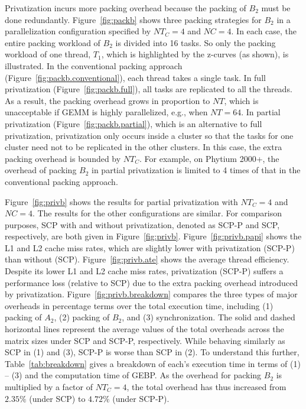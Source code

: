 Privatization incurs more packing overhead because
the packing of $B_2$ must be done redundantly.
Figure~\ref{fig:packb} shows three packing strategies for $B_2$
in a parallelization configuration specified by
$NT_C=4$ and $NC=4$.
In each case, the entire packing workload of $B_2$ is divided into 16 tasks.
So only the packing workload of one thread, $T_1$, 
which is highlighted by the z-curves (as shown), is illustrated.
In the conventional packing approach
(Figure~\ref{fig:packb.conventional}),
each thread takes a single task.
In full privatization
(Figure~\ref{fig:packb.full}),
all tasks are replicated to all
the threads.
As a result, the packing overhead grows in proportion to $NT$, which is unacceptable
if GEMM is highly parallelized, e.g., when $NT=64$.
In partial privatization 
(Figure~\ref{fig:packb.partial}), which is 
an alternative to full privatization,
privatization only occurs inside
a cluster so that the tasks for one cluster need not to be
replicated in the other clusters.
In this case, the extra packing overhead
is bounded by $NT_C$.
For example, on Phytium 2000+, the
overhead of packing $B_2$
in partial privatization is limited to 4 times
of that in the conventional packing approach.

Figure~\ref{fig:privb} shows the results for partial
privatization with $NT_C=4$ and $NC=4$.
The results for the other 
configurations are similar.
For comparison purposes,
SCP with and without privatization,
denoted as SCP-P and SCP, respectively,
are both given in Figure~\ref{fig:privb}.
Figure~\ref{fig:privb.papi} shows the L1 and L2
cache miss rates, which are 
slightly lower with privatization (SCP-P) than without
(SCP). Figure~\ref{fig:privb.ate} shows the average thread efficiency.
Despite its lower L1 and L2 cache miss rates,
privatization (SCP-P) suffers a performance loss
(relative to SCP) due to 
the extra packing overhead introduced by privatization.
Figure~\ref{fig:privb.breakdown} compares the
three types of major overheads in percentage terms 
over the total execution time, including
(1) packing of $A_2$, (2) packing of $B_2$,
and (3) synchronization.
The solid and dashed horizontal lines represent
the average values of the total overheads
across the matrix sizes
under SCP and SCP-P, respectively.
While behaving similarly as SCP
in (1) and (3), SCP-P is worse than SCP in (2).
To understand this further,
Table~\ref{tab:breakdown} gives a breakdown of each's
execution time in terms of (1) -- (3) and the
computation time of GEBP. As
the overhead for packing $B_2$
is multiplied by a factor of $NT_C=4$,
the total overhead has thus increased
from $2.35\%$ (under SCP) to $4.72\%$ (under SCP-P).

